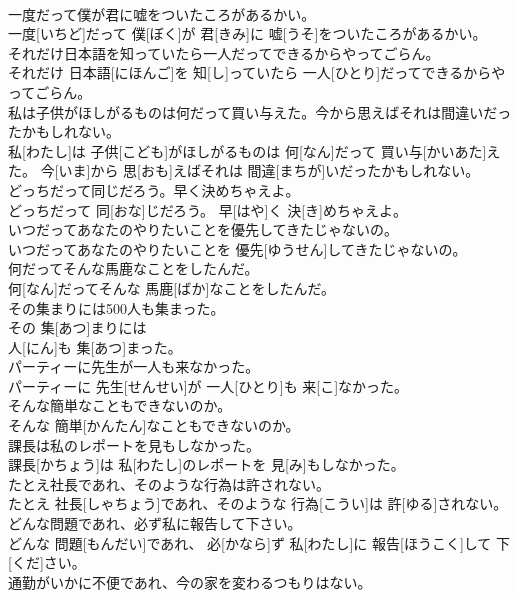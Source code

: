 \documentclass[8pt]{extreport}
\begin{document}
\begin{CJK}{UTF8}{min}
\\	一度だって僕が君に嘘をついたころがあるかい。	
\\	一度[いちど]だって 僕[ぼく]が 君[きみ]に 嘘[うそ]をついたころがあるかい。
\\	それだけ日本語を知っていたら一人だってできるからやってごらん。	
\\	それだけ 日本語[にほんご]を 知[し]っていたら 一人[ひとり]だってできるからやってごらん。
\\	私は子供がほしがるものは何だって買い与えた。今から思えばそれは間違いだったかもしれない。	
\\	私[わたし]は 子供[こども]がほしがるものは 何[なん]だって 買い与[かいあた]えた。 今[いま]から 思[おも]えばそれは 間違[まちが]いだったかもしれない。
\\	どっちだって同じだろう。早く決めちゃえよ。	
\\	どっちだって 同[おな]じだろう。 早[はや]く 決[き]めちゃえよ。
\\	いつだってあなたのやりたいことを優先してきたじゃないの。	
\\	いつだってあなたのやりたいことを 優先[ゆうせん]してきたじゃないの。
\\	何だってそんな馬鹿なことをしたんだ。	
\\	何[なん]だってそんな 馬鹿[ばか]なことをしたんだ。
\\	その集まりには500人も集まった。	
\\	その 集[あつ]まりには 
\\	人[にん]も 集[あつ]まった。
\\	パーティーに先生が一人も来なかった。	
\\	パーティーに 先生[せんせい]が 一人[ひとり]も 来[こ]なかった。
\\	そんな簡単なこともできないのか。	
\\	そんな 簡単[かんたん]なこともできないのか。
\\	課長は私のレポートを見もしなかった。	
\\	課長[かちょう]は 私[わたし]のレポートを 見[み]もしなかった。
\\	たとえ社長であれ、そのような行為は許されない。	
\\	たとえ 社長[しゃちょう]であれ、そのような 行為[こうい]は 許[ゆる]されない。
\\	どんな問題であれ、必ず私に報告して下さい。	
\\	どんな 問題[もんだい]であれ、 必[かなら]ず 私[わたし]に 報告[ほうこく]して 下[くだ]さい。
\\	通勤がいかに不便であれ、今の家を変わるつもりはない。	

\end{CJK}
\end{document}
